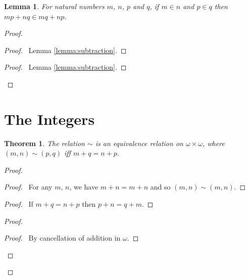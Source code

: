 \documentclass{article}
\let\qed\relax
\newtheorem{lemma}[axiom]{Lemma}
\newtheorem{theorem}[axiom]{Theorem}
\theoremstyle{definition}
\begin{document}
    \begin{lemma}
        \label{lemma:pre_integer_ordering}
        For natural numbers $m$, $n$, $p$ and $q$, if $m \in n$ and $p \in q$
        then $mp + nq \in mq + np$.
    \end{lemma}

    \begin{proof}
        \begin{proof}
            \pf\ Lemma \ref{lemma:subtraction}.
        \end{proof}
        \begin{proof}
            \pf\ Lemma \ref{lemma:subtraction}.
        \end{proof}
    \end{proof}

    \section{The Integers}

    \begin{theorem}
        The relation $\sim$ is an equivalence relation on $\omega \times \omega$, where $(m,n) \sim (p,q)$ iff
        $m + q = n + p$.
    \end{theorem}

    \begin{proof}
        \pf
        \begin{proof}
            \pf\ For any $m$, $n$, we have $m + n = m + n$ and so $(m,n) \sim (m,n)$.
        \end{proof}
        \begin{proof}
            \pf\ If $m + q = n + p$ then $p + n = q + m$.
        \end{proof}
        \begin{proof}
            \begin{proof}
                \pf\ By cancellation of addition in $\omega$.
            \end{proof}
        \end{proof}
        \qed
    \end{proof}
\end{document}
